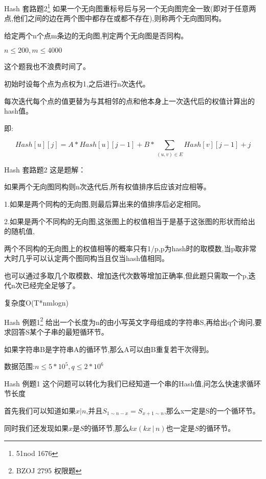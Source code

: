 \documentclass[10pt]{beamer}
\begin{document}
	\begin{frame}{Hash 套路题2\footnote{51nod 1676}}
	如果一个无向图重标号后与另一个无向图完全一致(即对于任意两点,他们之间的边在两个图中都存在或都不存在),则称两个无向图同构。

	给定两个n个点m条边的无向图,判定两个无向图是否同构。

	$n \leq 200, m \leq 4000$

	这个题我也不浪费时间了。\pause


	初始时设每个点为点权为1,之后进行n次迭代。

	每次迭代每个点的值更替为与其相邻的点和他本身上一次迭代后的权值计算出的hash值。

	即:

	$$Hash[u][j]=A*Hash[u][j-1]+B*\sum_{(u,v) \in E}Hash[v][j-1]+j$$
	\end{frame}
	\begin{frame}{Hash 套路题2}
	这是题解：

	如果两个无向图同构则n次迭代后,所有权值排序后应该对应相等。

	1.如果是两个同构的无向图,则最后算出来的值排序后必定相同。

	2.如果是两个不同构的无向图,这张图上的权值相当于是基于这张图的形状而给出的随机值,

	两个不同构的无向图上的权值相等的概率只有1/p,p为hash时的取模数,当p取非常大时几乎可以认定两个图同构当且仅当hash值相同。

	也可以通过多取几个取模数、增加迭代次数等增加正确率,但此题只需取一个p,迭代n次已经完全足够了。

	复杂度O(T*nmlogn)
	\end{frame}
	\begin{frame}{Hash 例题1\footnote{BZOJ 2795 权限题}}
		给出一个长度为n的由小写英文字母组成的字符串S,再给出q个询问,要求回答S某个子串的最短循环节。

		如果字符串B是字符串A的循环节,那么A可以由B重复若干次得到。

		数据范围:$n \leq 5*10^5 , q \leq 2*10^6$

	\end{frame}
	\begin{frame}{Hash 例题1}
		这个问题可以转化为我们已经知道一个串的Hash值,问怎么快速求循环节长度\pause

		\vspace{3ex}
		首先我们可以知道如果$x|n$,并且$S_{1 \sim n-x}=S_{x+1 \sim n}$,那么x一定是S的一个循环节。\pause

		\vspace{3ex}
		同时我们还发现如果$x$是$S$的循环节,那么$kx (kx \, | \, n)$也一定是$S$的循环节。
	\end{frame}
\end{document}
